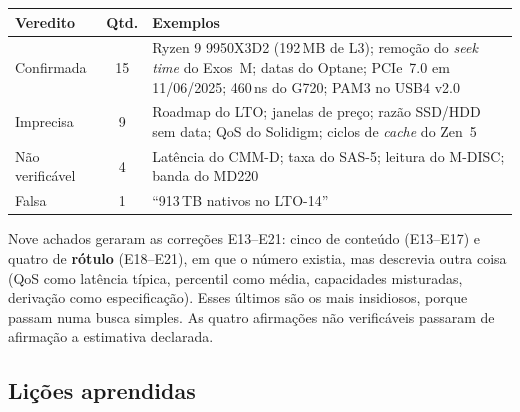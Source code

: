 \documentclass[11pt,a4paper]{article}
\begin{document}
\begin{center}\small
\begin{tabular}{@{}lcp{10.2cm}@{}}
\toprule
\textbf{Veredito} & \textbf{Qtd.} & \textbf{Exemplos} \\
\midrule
Confirmada & 15 & Ryzen 9 9950X3D2 (192\,MB de L3); remoção do \emph{seek time} do Exos~M; datas do Optane; PCIe~7.0 em 11/06/2025; 460\,ns do G720; PAM3 no USB4 v2.0 \\
Imprecisa & 9 & Roadmap do LTO; janelas de preço; razão SSD/HDD sem data; QoS do Solidigm; ciclos de \emph{cache} do Zen~5 \\
Não verificável & 4 & Latência do CMM-D; taxa do SAS-5; leitura do M-DISC; banda do MD220 \\
Falsa & 1 & ``913\,TB nativos no LTO-14'' \\
\bottomrule
\end{tabular}
\end{center}

Nove achados geraram as correções E13--E21: cinco de conteúdo (E13--E17) e quatro de
\textbf{rótulo} (E18--E21), em que o número existia, mas descrevia outra coisa (QoS como
latência típica, percentil como média, capacidades misturadas, derivação como especificação).
Esses últimos são os mais insidiosos, porque passam numa busca simples. As quatro afirmações
não verificáveis passaram de afirmação a estimativa declarada.

\subsection{Lições aprendidas}
\end{document}

